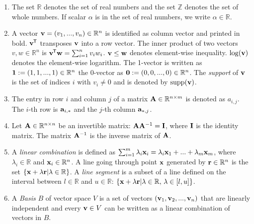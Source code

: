 \begin{enumerate}
    \item The set $\mathbb{R}$ denotes the set of real numbers and the set $\mathbb{Z}$ denotes the set of whole numbers. If scalar $\alpha$ is in the set of real numbers, we write $\alpha \in \mathbb R$. %
    
    \item A vector $\bold{v} = (v_1, ..., v_n) \in \mathbb{R}^n$ is identified as column vector and printed in bold. $\bold v ^{\mkern-1.5mu\mathsf{T}}$ transposes $\bold v$ into a row vector. The inner product of two vectors $v, w \in \mathbb{R}^n$ is $\bold v ^{\mkern-1.5mu\mathsf{T}} \bold w = \sum_{i=1}^n v_i w_i$. $\bold v \leq \bold w$ denotes element-wise inequality. $\log (\bold v)$ denotes the element-wise logarithm. The 1-vector is written as $\bold 1 := (1, 1, ..., 1) \in \mathbb{R}^n$ the 0-vector as $\bold 0 := (0, 0, ..., 0) \in \mathbb{R}^n$. The \textit{support} of $\bold{v}$ is the set of indices $i$ with $v_i \neq 0$ and is denoted by $\text{supp}(\bold v)$.

    \item The entry in row $i$ and column $j$ of a matrix $ \bold A \in \mathbb{R}^{n \times m}$ is denoted as $a_{i,j}$. The $i$-th row is $\bold a_{i,*}$ and the $j$-th column $\bold a_{*,j}$. 
    
    \item Let $\bold A \in \mathbb{R}^{n \times n}$ be an invertible matrix: $ \bold A \bold A^{-1} = \bold I$, where $\bold I$ is the identity matrix. The matrix $ \bold A^{-1}$ is the inverse matrix of $ \bold A$. 

    \item A \textit{linear combination} is defined as $\sum_{i=1}^{m} \lambda_i \bold x_i = 
    \lambda_i \bold x_1 + ... + \lambda_m \bold x_m$, where $\lambda_i \in \mathbb{R}$ and $\bold x_i \in \mathbb{R}^n$.
    A line going through point $\bold x$ generated by $\bold r \in \mathbb{R}^n$ is the set $\{\bold x + \lambda \bold r | \lambda \in \mathbb{R}\}$. A \textit{line segment} is a subset of a line defined on the interval between $l \in \mathbb{R}$ and $u \in \mathbb{R}$: $\{\bold x + \lambda \bold r | \lambda \in \mathbb{R}, \, \lambda \in [l, u ]\}$.

    \item A \textit{Basis} $B$ of vector space $V$ is a set of vectors $(\bold v_1, \bold v_2, ..., \bold v_n)$ that are linearly independent and every $\bold v \in V$ can be written as a linear combination of vectors in $B$.


\end{enumerate}
